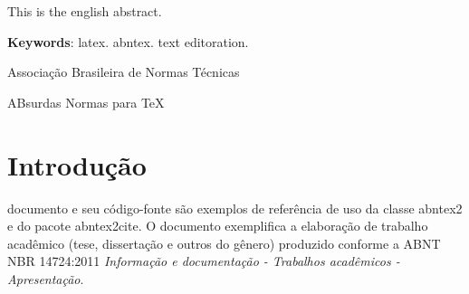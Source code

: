 \documentclass[
	12pt,				%
	openright,			%
	a4paper,			%
	fleqn, %
	english,			%
	french,				%
	spanish,			%
	brazil,				%
	]{abntex2}
\newcounter{savepage}
\begin{document}
\begin{resumo}
\noindent
This is the english abstract.

\vspace{\onelineskip}
    
\noindent
\textbf{Keywords}: latex. abntex. text editoration.
\end{resumo} %


\tableofcontents*
\begin{siglas}
  \item[ABNT] Associação Brasileira de Normas Técnicas
  \item[abnTeX] ABsurdas Normas para TeX
    \thispagestyle{plain}
\end{siglas}


\listoffigures* %
\thispagestyle{plain}\cleardoublepage %


\listoftables*
\thispagestyle{plain}


\textual


\setcounter{page}{\thesavepage}


\chapter{Introdução} %

 documento e seu código-fonte são exemplos de referência de uso da classe
\textsf{abntex2} e do pacote \textsf{abntex2cite}. O documento 
exemplifica a elaboração de trabalho acadêmico (tese, dissertação e outros do
gênero) produzido conforme a ABNT NBR 14724:2011 \emph{Informação e documentação
- Trabalhos acadêmicos - Apresentação}.
\end{document}
